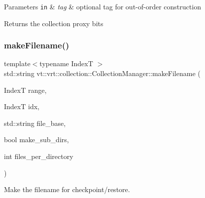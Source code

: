 \begin{DoxyParams}[1]{Parameters}
\mbox{\tt in}  & {\em tag} & optional tag for out-\/of-\/order construction\\
\hline
\end{DoxyParams}
\begin{DoxyReturn}{Returns}
the collection proxy bits 
\end{DoxyReturn}
\mbox{\label{structvt_1_1vrt_1_1collection_1_1_collection_manager_ae8d3db4274a1239fa0097dae11e93bb9}} 
\subsubsection{\texorpdfstring{make\+Filename()}{makeFilename()}}
{\footnotesize\ttfamily template$<$typename IndexT $>$ \\
std\+::string vt\+::vrt\+::collection\+::\+Collection\+Manager\+::make\+Filename (\begin{DoxyParamCaption}\item[{IndexT}]{range,  }\item[{IndexT}]{idx,  }\item[{std\+::string}]{file\+\_\+base,  }\item[{bool}]{make\+\_\+sub\+\_\+dirs,  }\item[{int}]{files\+\_\+per\+\_\+directory }\end{DoxyParamCaption})}



Make the filename for checkpoint/restore. 


